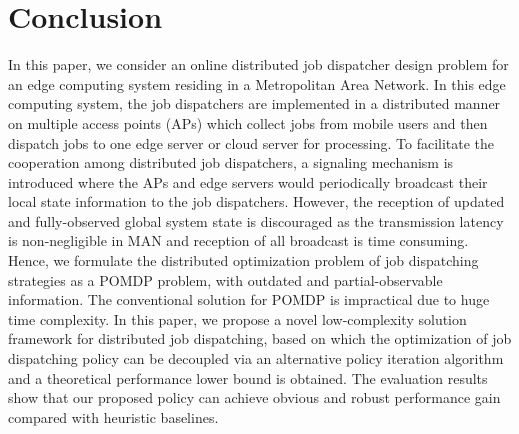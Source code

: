 \section{Conclusion}
\label{sec:conclusion}
In this paper, we consider an online distributed job dispatcher design problem for an edge computing system residing in a Metropolitan Area Network.
In this edge computing system, the job dispatchers are implemented in a distributed manner on multiple access points (APs) which collect jobs from mobile users and then dispatch jobs to one edge server or cloud server for processing.
To facilitate the cooperation among distributed job dispatchers, a signaling mechanism is introduced where the APs and edge servers would periodically broadcast their local state information to the job dispatchers.
However, the reception of updated and fully-observed global system state is discouraged as the transmission latency is non-negligible in MAN and reception of all broadcast is time consuming.
Hence, we formulate the distributed optimization problem of job dispatching strategies as a POMDP problem, with outdated and partial-observable information.
The conventional solution for POMDP is impractical due to huge time complexity.
In this paper, we propose a novel low-complexity solution framework for distributed job dispatching, based on which the optimization of job dispatching policy can be decoupled via an alternative policy iteration algorithm and a theoretical performance lower bound is obtained.
The evaluation results show that our proposed policy can achieve obvious and robust performance gain compared with heuristic baselines.

